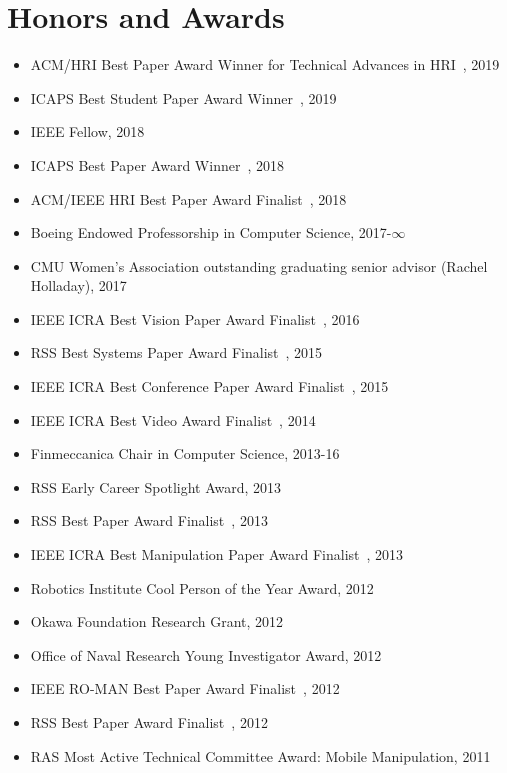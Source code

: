 

\section{Honors and Awards}
\begin{itemize}
\addtolength{\itemsep}{-0.5\baselineskip}
\item ACM/HRI Best Paper Award Winner for Technical Advances in HRI~\cite{gallenberger2019skewering}, 2019
\item ICAPS Best Student Paper Award Winner~\cite{mandalika2019gls}, 2019
\item IEEE Fellow, 2018
\item ICAPS Best Paper Award Winner~\cite{haghtalab2018laziness}, 2018
\item ACM/IEEE HRI Best Paper Award Finalist~\cite{chen2018trust}, 2018
\item Boeing Endowed Professorship in Computer Science, 2017-$\infty$
\item CMU Women’s Association outstanding graduating senior advisor (Rachel Holladay), 2017
\item IEEE ICRA Best Vision Paper Award Finalist~\cite{klingensmith2016armslamconf}, 2016
\item RSS Best Systems Paper Award Finalist~\cite{klingensmith2015chisel}, 2015
\item IEEE ICRA Best Conference Paper Award Finalist~\cite{dragan2015dmp}, 2015
\item IEEE ICRA Best Video Award Finalist~\cite{chavandafle2014extrinsic}, 2014
\item Finmeccanica Chair in Computer Science, 2013-16
\item RSS Early Career Spotlight Award, 2013
\item RSS Best Paper Award Finalist~\cite{dragan2013legible}, 2013
\item IEEE ICRA Best Manipulation Paper Award Finalist~\cite{javdani2013tactile}, 2013
\item Robotics Institute Cool Person of the Year Award, 2012
\item Okawa Foundation Research Grant, 2012
\item Office of Naval Research Young Investigator Award, 2012
\item IEEE RO-MAN Best Paper Award Finalist~\cite{dragan2012custom}, 2012
\item RSS Best Paper Award Finalist~\cite{dragan2012formalizing}, 2012
\item RAS Most Active Technical Committee Award: Mobile Manipulation, 2011 

\end{itemize}
